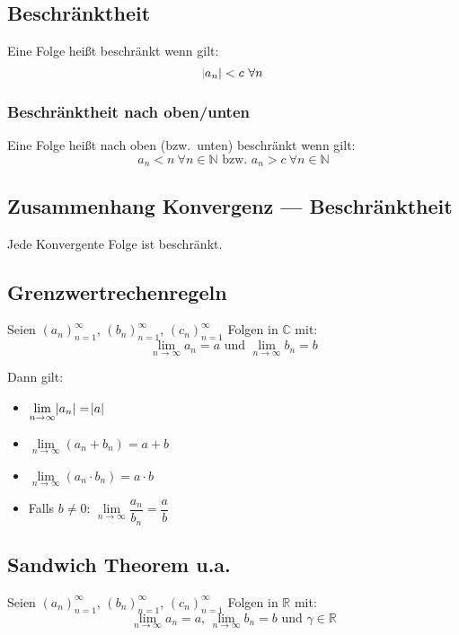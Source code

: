 \documentclass[10pt]{article}
\newcommand{\R}{\mathbb{R}}
\newcommand{\C}{\mathbb{C}}
\newcommand{\an}{{(a_n)}_{n=1}^\infty}
\begin{document}
    \subsection{Beschränktheit}
    Eine Folge heißt beschränkt wenn gilt:
    \begin{equation*}
        \abs{a_n} < c\ \forall n
    \end{equation*}

    \subsubsection{Beschränktheit nach oben/unten}
    Eine Folge heißt nach oben (bzw.~unten) beschränkt wenn gilt:
    \begin{equation*}
        a_n < n\ \forall n \in \mathbb{N} \text{ bzw. }a_n > c\ \forall n \in \mathbb{N}
    \end{equation*}

    \subsection{Zusammenhang Konvergenz --- Beschränktheit}
    Jede Konvergente Folge ist beschränkt.

    \subsection{Grenzwertrechenregeln}
    Seien $\an$, ${(b_n)}_{n=1}^\infty$, ${(c_n)}_{n=1}^\infty$ Folgen
    in $\C$ mit:
    \begin{equation*}
        \lim_{n \rightarrow \infty} a_n = a \text{ und }
        \lim_{n \rightarrow \infty} b_n = b
    \end{equation*}

    Dann gilt:

    \begin{itemize}
        \item $\lim\limits_{n \rightarrow \infty} \abs{a_n} = \abs{a}$
        \item $\lim\limits_{n \rightarrow \infty}(a_n + b_n) = a + b$
        \item $\lim\limits_{n \rightarrow \infty}(a_n \cdot b_n) = a \cdot b$
        \item Falls $b \neq 0$:
        $\lim\limits_{n \rightarrow \infty}\dfrac{a_n}{b_n} = \dfrac{a}{b}$
    \end{itemize}

    \subsection{Sandwich Theorem u.a.}
    Seien $\an$, ${(b_n)}_{n=1}^\infty$, ${(c_n)}_{n=1}^\infty$
    Folgen in $\R$ mit:
    \begin{equation*}
        \lim_{n \rightarrow \infty}a_n = a \text{, }
        \lim_{n \rightarrow \infty}b_n = b \text{ und } \gamma \in \mathbb{R}
    \end{equation*}
\end{document}
